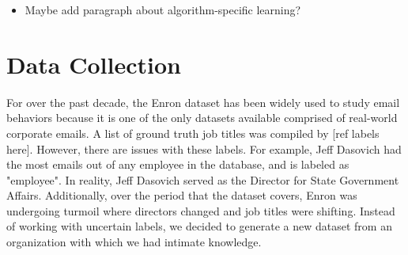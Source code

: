 \documentclass{article}
\begin{document}
\begin{itemize}
\item Maybe add paragraph about algorithm-specific learning?
\end{itemize}

\section{Data Collection} \label{Data Collection}
For over the past decade, the Enron dataset has been widely used to study email behaviors because it is one of the only datasets available comprised of real-world corporate emails.  A list of ground truth job titles was compiled by [ref labels here].  However, there are issues with these labels.  For example, Jeff Dasovich had the most emails out of any employee in the database, and is labeled as "employee".  In reality, Jeff Dasovich served as the Director for State Government Affairs. Additionally, over the period that the dataset covers, Enron was undergoing turmoil where directors changed and job titles were shifting.  Instead of working with uncertain labels, we decided to generate a new dataset from an organization with which we had intimate knowledge.
\end{document}
